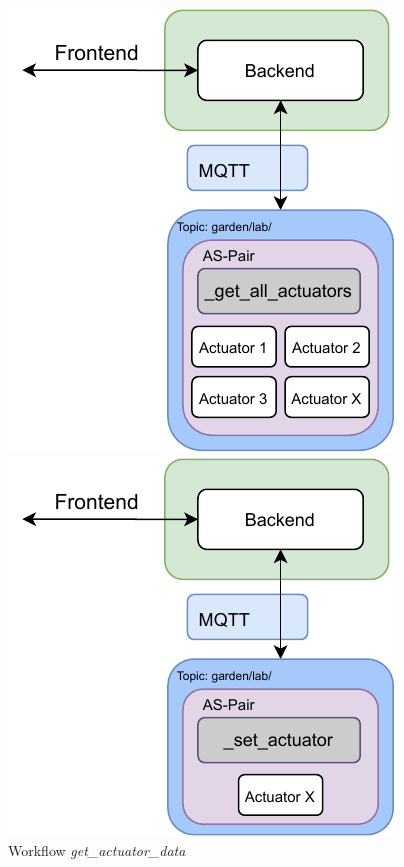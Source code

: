 \begin{figure}
    \vspace{\baselineskip}
    \centering
     \captionsetup{justification=centering}
     \vspace{-4mm}
     \begin{minipage}[b]{0.39\textwidth}
         \centering
         \includegraphics[width=\textwidth]{images/4_2_1/get_actuator.pdf}
         \caption{Workflow \textit{get\_actuator\_data}}
         \label{fig:get_act}\par
         \vspace{9mm}
         \includegraphics[width=\textwidth]{images/4_2_1/set_actuator.pdf}

\end{minipage}
\end{figure}
